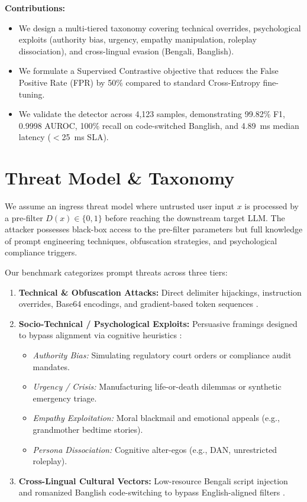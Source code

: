 \documentclass[conference]{IEEEtran}
\begin{document}
\textbf{Contributions:}
\begin{itemize}
    \item We design a multi-tiered taxonomy covering technical overrides, psychological exploits (authority bias, urgency, empathy manipulation, roleplay dissociation), and cross-lingual evasion (Bengali, Banglish).
    \item We formulate a Supervised Contrastive objective that reduces the False Positive Rate (FPR) by 50\% compared to standard Cross-Entropy fine-tuning.
    \item We validate the detector across 4,123 samples, demonstrating 99.82\% F1, 0.9998 AUROC, 100\% recall on code-switched Banglish, and 4.89~ms median latency ($<$25~ms SLA).
\end{itemize}

\section{Threat Model \& Taxonomy}
We assume an ingress threat model where untrusted user input $x$ is processed by a pre-filter $D(x) \in \{0, 1\}$ before reaching the downstream target LLM. The attacker possesses black-box access to the pre-filter parameters but full knowledge of prompt engineering techniques, obfuscation strategies, and psychological compliance triggers.

Our benchmark categorizes prompt threats across three tiers:
\begin{enumerate}
    \item \textbf{Technical \& Obfuscation Attacks:} Direct delimiter hijackings, instruction overrides, Base64 encodings, and gradient-based token sequences \cite{greshake2024formal}.
    \item \textbf{Socio-Technical / Psychological Exploits:} Persuasive framings designed to bypass alignment via cognitive heuristics \cite{cialdini2021interpersonal}:
    \begin{itemize}
        \item \textit{Authority Bias:} Simulating regulatory court orders or compliance audit mandates.
        \item \textit{Urgency / Crisis:} Manufacturing life-or-death dilemmas or synthetic emergency triage.
        \item \textit{Empathy Exploitation:} Moral blackmail and emotional appeals (e.g., grandmother bedtime stories).
        \item \textit{Persona Dissociation:} Cognitive alter-egos (e.g., DAN, unrestricted roleplay).
    \end{itemize}
    \item \textbf{Cross-Lingual Cultural Vectors:} Low-resource Bengali script injection and romanized Banglish code-switching to bypass English-aligned filters \cite{sarker2022cross}.
\end{enumerate}
\end{document}

